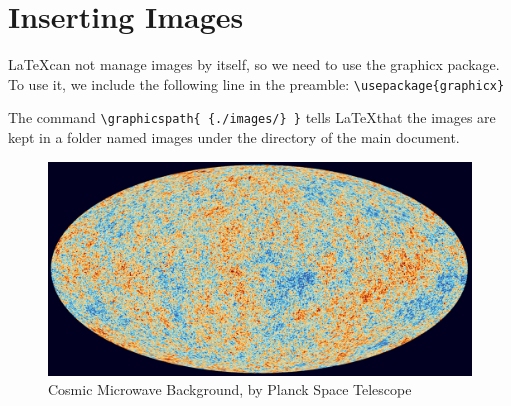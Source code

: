 \documentclass[letterpaper]{article}
\begin{document}
\newpage

\section{Inserting Images}
\LaTeX can not manage images by itself, so we need to use the graphicx package. 
To use it, we include the following line in the preamble: 
\verb+\usepackage{graphicx}+

The command \verb+\graphicspath{ {./images/} }+ tells \LaTeX that the images 
are kept in a folder named images under the directory of the main document.

\begin{figure}[h]
\includegraphics[width=\textwidth]{cosmic-microwave-background}
\caption{Cosmic Microwave Background, by Planck Space Telescope}
\end{figure}

\newpage

\lstlistoflistings

\listoffigures
\end{document}
